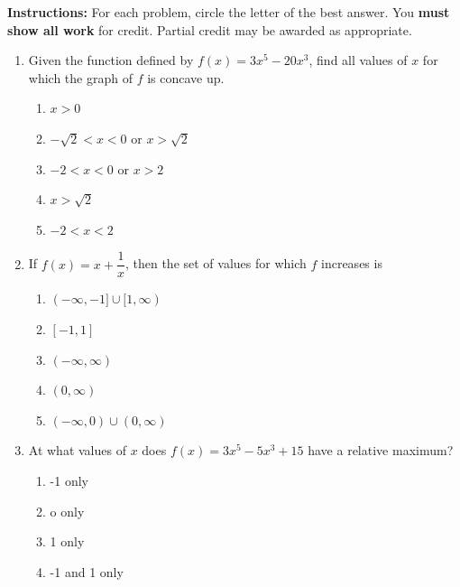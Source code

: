 \documentclass{article}
\begin{document}
\pagestyle{fancy}
\fancyhf{}
\renewcommand{\footrulewidth}{0.4pt}

\noindent
\textbf{Instructions:} For each problem, circle the letter of the best answer.
You \textbf{must show all work} for credit. Partial credit may be awarded as appropriate.

\begin{enumerate}
	\itemsep2em
	\item
	\begin{minipage}[t]{\linewidth}
		Given the function defined by \(f(x)=3 x^{5}-20 x^{3}\), find all values
of \(x\) for which the graph of \(f\) is concave up.
\vspace{1em}
		\begin{enumerate}
		\itemsep1em
			\item \(x>0\)
			\item \(-\sqrt{2}<x<0\) or \(x>\sqrt{2}\)
			\item \(-2<x<0\) or \(x>2\)
			\item \(x>\sqrt{2}\)
			\item \(-2<x<2\)
		\end{enumerate}
	\end{minipage}
	\item
	\begin{minipage}[t]{\linewidth}
		If \(f(x)=x+\dfrac{1}{x}\), then the set of values for which \(f\)
increases is
\vspace{1em}
		\begin{enumerate}
		\itemsep1em
			\item \((-\infty,-1] \cup[1, \infty)\)
			\item \([-1,1]\)
			\item \((-\infty, \infty)\)
			\item \((0, \infty)\)
			\item \((-\infty, 0) \cup(0, \infty)\)
		\end{enumerate}
	\end{minipage}
	\item
	\begin{minipage}[t]{\linewidth}
		At what values of \(x\) does \(f(x)=3 x^{5}-5 x^{3}+15\) have a relative
maximum?
\vspace{1em}
		\begin{enumerate}
		\itemsep1em
			\item -1 only
			\item o only
			\item 1 only
			\item -1 and 1 only

\end{enumerate}
\end{minipage}
\end{enumerate}
\end{document}
